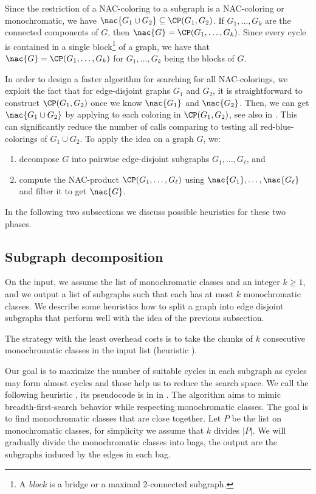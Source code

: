 Since the restriction of a NAC-coloring to a subgraph is a NAC-coloring or monochromatic,
we have $\nac{G_{1} \cup G_{2}} \subseteq \CP(G_{1}, G_{2})$.
If $G_1, \dots, G_k$ are the connected components of $G$,
then $\nac{G} = \CP(G_1,\ldots, G_k)$.
Since every cycle is contained in a single
block\footnote{A \emph{block} is a bridge or a maximal 2-connected subgraph.}
of a graph, we have that $\nac{G} = \CP(G_1,\ldots, G_k)$
for $G_1,\ldots, G_k$ being the blocks of $G$.

In order to design a faster algorithm for searching for all NAC-colorings,
we exploit the fact that for edge-disjoint graphs $G_1$ and $G_2$,
it is straightforward to construct $\CP(G_{1}, G_{2})$ once we know $\nac{G_1}$ and $\nac{G_2}$.
Then, we can get $\nac{G_{1} \cup G_{2}}$ by applying \IsNACColoring{}
to each coloring in $\CP(G_{1}, G_{2})$, see also  in .
This can significantly reduce the number of \IsNACColoring{} calls
comparing to testing all red-blue-colorings of $G_{1} \cup G_{2}$.
To apply the idea on a graph $G$, we:
\begin{enumerate}
	\item decompose $G$ into pairwise edge-disjoint subgraphs $G_1, \ldots, G_\ell$, and
	\item compute the NAC-product $\CP(G_1, \dots, G_\ell)$ using $\nac{G_1}, \ldots, \nac{G_\ell}$
	      and filter it to get $\nac{G}$.
\end{enumerate}
In the following two subsections we discuss possible heuristics
for these two phases.



\subsection{Subgraph decomposition}%
\label{sec:decomposition}

On the input, we assume the list of monochromatic classes
and an integer $k\geq 1$, and we output a list of subgraphs
such that each has at most $k$ monochromatic classes.
We describe some heuristics how to split a graph into edge disjoint subgraphs
that perform well with the idea of the previous subsection.

The strategy with the least overhead costs is to take the chunks of $k$ consecutive
monochromatic classes in the input list (heuristic \None{}).

Our goal is to maximize the number of suitable cycles in each
subgraph as cycles may form almost cycles and those help us to reduce the search
space.
We call the following heuristic \Neighbors{},
its pseudocode is in  in .
The algorithm aims to mimic breadth-first-search
behavior while respecting monochromatic classes.
The goal is to find monochromatic classes that are close together.
Let $P$ be the list on monochromatic classes,
for simplicity we assume that $k$ divides $|P|$.
We will gradually divide the monochromatic classes into bags,
the output are the subgraphs induced by the edges in each bag.


